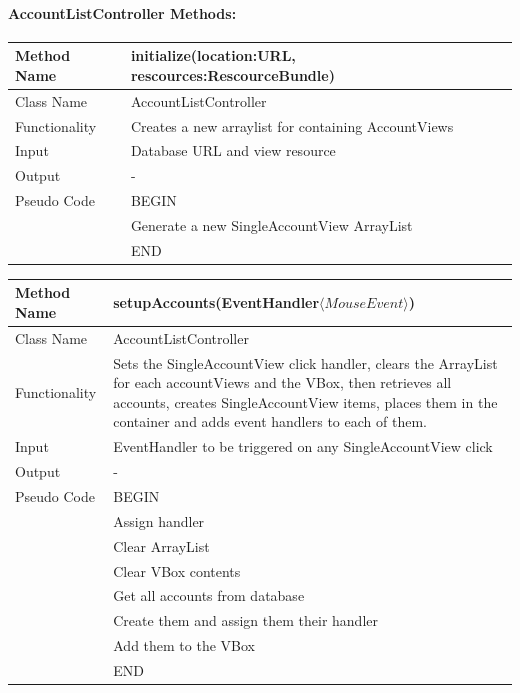 \documentclass[12pt]{article}
\begin{document}
\paragraph{AccountListController Methods:}

\begin{tabular}{ |p{3cm}||p{\colWidth}|  }
	\hline
	Method Name &  initialize(location:URL, rescources:RescourceBundle) \\
	\hline
	Class Name & AccountListController\\
	\hline
	Functionality & Creates a new arraylist for containing AccountViews\\
	\hline
	Input & Database URL and view resource\\
	\hline
	Output & -\\
	\hline
	Pseudo Code & BEGIN\\
	& Generate a new SingleAccountView ArrayList \\
	& END\\
	\hline
\end{tabular} 


\begin{tabular}{ |p{3cm}||p{\colWidth}|  }
	\hline
	Method Name & setupAccounts(EventHandler$\langle MouseEvent \rangle$)\\
	\hline
	Class Name & AccountListController\\
	\hline
	Functionality & Sets the SingleAccountView click handler, clears the ArrayList for each accountViews and the VBox, then retrieves all accounts, creates SingleAccountView items, places them in the container and adds event handlers to each of them. \\
	\hline
	Input & EventHandler to be triggered on any SingleAccountView click\\
	\hline
	Output & -\\
	\hline
	Pseudo Code & BEGIN\\
	& Assign handler\\
	& Clear ArrayList\\
	& Clear VBox contents\\
	& Get all accounts from database\\
	& Create them and assign them their handler\\
	& Add them to the VBox \\
	& END\\
	\hline
\end{tabular} 
\end{document}
